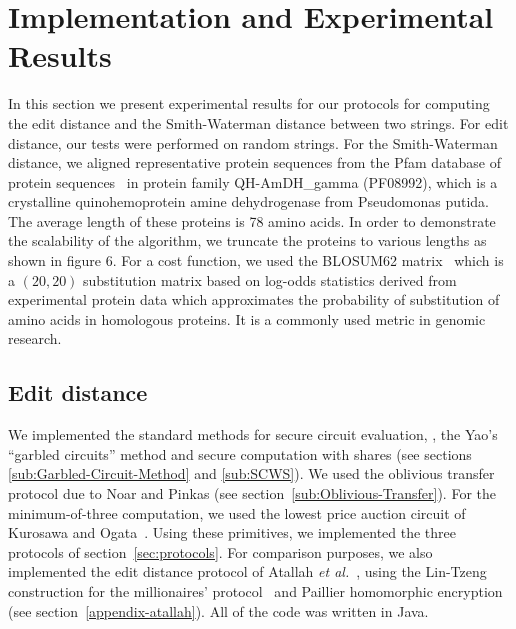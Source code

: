 \section{Implementation and Experimental Results}
\label{sec:genomics-experimental}

In this section we present experimental results for our protocols for
computing the edit distance and the Smith-Waterman distance between
two strings.  For edit distance, our tests were performed on random
strings.  For the Smith-Waterman distance, we aligned representative protein
sequences from the Pfam database of protein sequences~\cite{pfam2002}
in protein family {\sf QH-AmDH\_gamma (PF08992)}, which is a
crystalline quinohemoprotein amine dehydrogenase from Pseudomonas
putida.  The average length of these proteins is 78 amino acids.  In
order to demonstrate the scalability of the algorithm, we truncate the
proteins to various lengths as shown in figure 6.  For a cost
function, we used the BLOSUM62 matrix~\cite{blosum62} which is a
$(20,20)$ substitution matrix based on log-odds statistics derived
from experimental protein data which approximates the probability of
substitution of amino acids in homologous proteins.  It is a commonly
used metric in genomic research.

\subsection{Edit distance}


We implemented the standard methods for secure circuit evaluation,
\ie, the Yao's ``garbled circuits'' method and secure computation with
shares (see sections \ref{sub:Garbled-Circuit-Method} and \ref{sub:SCWS}).  We used the oblivious transfer
protocol due to Noar and Pinkas (see section~\ref{sub:Oblivious-Transfer}).  For the
minimum-of-three computation, we used the lowest price auction circuit of
Kurosawa and Ogata~\cite{KO02}.  Using these primitives, we implemented
the three protocols of section~\ref{sec:protocols}.  For comparison
purposes, we also implemented the edit distance protocol of Atallah
\textit{et al.}~\cite{atallah}, using the Lin-Tzeng construction for
the millionaires' protocol~\cite{lintzeng-acns05} and Paillier homomorphic
encryption~\cite{Paillier99} (see section~\ref{appendix-atallah}).
All of the code was written in Java.

